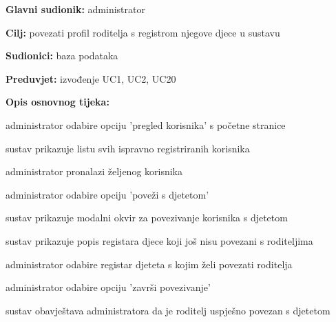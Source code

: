                     \noindent {}
					\begin{packed_item}
	
						\item \textbf{Glavni sudionik: }administrator
						\item  \textbf{Cilj:} povezati profil roditelja s registrom njegove djece u sustavu
						\item  \textbf{Sudionici:} baza podataka
						\item  \textbf{Preduvjet:} izvođenje UC1, UC2, UC20
						\item  \textbf{Opis osnovnog tijeka:}
						
						\item[] \begin{packed_enum}
							\item administrator odabire opciju 'pregled korisnika' s početne stranice
							\item sustav prikazuje listu svih ispravno registriranih korisnika
							\item administrator pronalazi željenog korisnika
							\item administrator odabire opciju 'poveži s djetetom'
							\item sustav prikazuje modalni okvir za povezivanje korisnika s djetetom
							\item sustav prikazuje popis registara djece koji još nisu povezani s roditeljima
							\item administrator odabire registar djeteta s kojim želi povezati roditelja
							\item administrator odabire opciju 'završi povezivanje'
							\item sustav obavještava administratora da je roditelj uspješno povezan s djetetom
						
						\end{packed_enum}
						
					\end{packed_item}
                    
